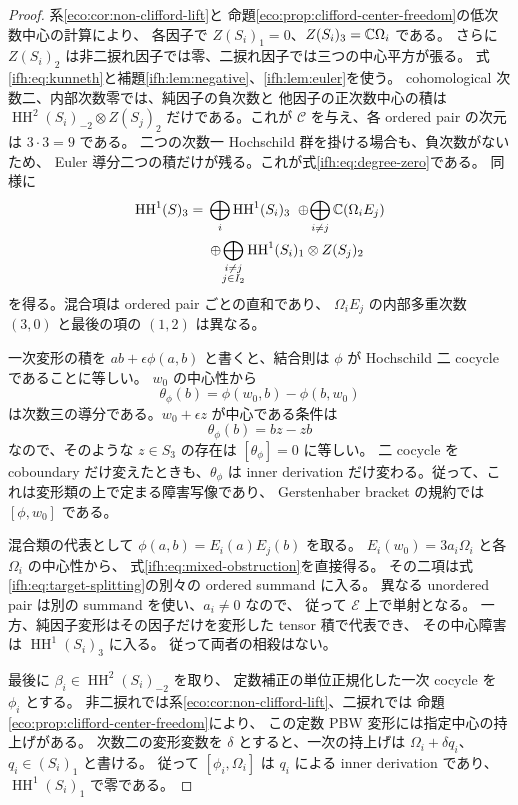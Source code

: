 \begin{proof}
系\ref{eco:cor:non-clifford-lift}と
命題\ref{eco:prop:clifford-center-freedom}の低次数中心の計算により、
各因子で $Z(S_i)_1=0$、$Z(S_i)_3=\mathbb C\Omega_i$ である。
さらに $Z(S_i)_2$ は非二捩れ因子では零、二捩れ因子では三つの中心平方が張る。
式\eqref{ifh:eq:kunneth}と補題\ref{ifh:lem:negative}、\ref{ifh:lem:euler}を使う。
cohomological 次数二、内部次数零では、純因子の負次数と
他因子の正次数中心の積は $\operatorname{HH}^2(S_i)_{-2}\otimes Z(S_j)_2$
だけである。これが $\mathcal C$ を与え、各 ordered pair の次元は $3\cdot3=9$ である。
二つの次数一 Hochschild 群を掛ける場合も、負次数がないため、
Euler 導分二つの積だけが残る。これが式\eqref{ifh:eq:degree-zero}である。
同様に
\begin{equation}\label{ifh:eq:target-splitting}
 \begin{aligned}
 \operatorname{HH}^1(S)_3
    ={}&\bigoplus_i\operatorname{HH}^1(S_i)_3
       \ \oplus\!\bigoplus_{i\ne j}\mathbb C(\Omega_iE_j)\\
     &\oplus\!\bigoplus_{\substack{i\ne j\\j\in I_2}}
                 \operatorname{HH}^1(S_i)_1\otimes Z(S_j)_2
 \end{aligned}
\end{equation}
を得る。混合項は ordered pair ごとの直和であり、
$\Omega_iE_j$ の内部多重次数 $(3,0)$ と最後の項の $(1,2)$ は異なる。

一次変形の積を $ab+\epsilon\phi(a,b)$ と書くと、結合則は
$\phi$ が Hochschild 二 cocycle であることに等しい。
$w_0$ の中心性から
\[
                  \theta_\phi(b)
                       =\phi(w_0,b)-\phi(b,w_0)
\]
は次数三の導分である。$w_0+\epsilon z$ が中心である条件は
\[
                    \theta_\phi(b)=bz-zb
\]
なので、そのような $z\in S_3$ の存在は $[\theta_\phi]=0$ に等しい。
二 cocycle を coboundary だけ変えたときも、$\theta_\phi$ は inner derivation
だけ変わる。従って、これは変形類の上で定まる障害写像であり、
Gerstenhaber bracket の規約では $[\phi,w_0]$ である。

混合類の代表として
$\phi(a,b)=E_i(a)E_j(b)$ を取る。
$E_i(w_0)=3a_i\Omega_i$ と各 $\Omega_i$ の中心性から、
式\eqref{ifh:eq:mixed-obstruction}を直接得る。
その二項は式\eqref{ifh:eq:target-splitting}の別々の ordered summand に入る。
異なる unordered pair は別の summand を使い、$a_i\ne0$ なので、
従って $\mathcal E$ 上で単射となる。
一方、純因子変形はその因子だけを変形した tensor 積で代表でき、
その中心障害は $\operatorname{HH}^1(S_i)_3$ に入る。
従って両者の相殺はない。

最後に $\beta_i\in\operatorname{HH}^2(S_i)_{-2}$ を取り、
定数補正の単位正規化した一次 cocycle を $\phi_i$ とする。
非二捩れでは系\ref{eco:cor:non-clifford-lift}、二捩れでは
命題\ref{eco:prop:clifford-center-freedom}により、
この定数 PBW 変形には指定中心の持上げがある。
次数二の変形変数を $\delta$ とすると、一次の持上げは
$\Omega_i+\delta q_i$、$q_i\in(S_i)_1$ と書ける。
従って $[\phi_i,\Omega_i]$ は $q_i$ による inner derivation であり、
$\operatorname{HH}^1(S_i)_1$ で零である。


\end{proof}
